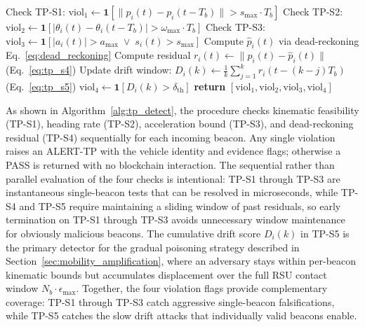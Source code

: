 \documentclass[12pt, a4paper]{report}
\begin{document}
\begin{algorithm}[H]
\caption{Trajectory Poisoning Detection (\texttt{TP-DETECT})}
\begin{algorithmic}[1]
  \small
  \State Check TP-S1: $\mathrm{viol}_1 \gets
    \mathbf{1}\!\left[\|p_i(t)-p_i(t{-}T_b)\| > s_{\max}\cdot T_b\right]$
  \State Check TP-S2: $\mathrm{viol}_2 \gets
    \mathbf{1}\!\left[|\theta_i(t)-\theta_i(t{-}T_b)| > \omega_{\max}\cdot T_b\right]$
  \State Check TP-S3: $\mathrm{viol}_3 \gets
    \mathbf{1}\!\left[|a_i(t)| > a_{\max}
    \;\lor\; s_i(t) > s_{\max}\right]$
  \State Compute $\hat{p}_i(t)$ via dead-reckoning Eq.~\eqref{eq:dead_reckoning}
  \State Compute residual $r_i(t) \gets \|p_i(t) - \hat{p}_i(t)\|$
         \quad (Eq.~\eqref{eq:tp_s4})
  \State Update drift window: $D_i(k) \gets \frac{1}{k}\sum_{j=1}^{k} r_i(t{-}(k{-}j)T_b)$
         \quad (Eq.~\eqref{eq:tp_s5})
  \State $\mathrm{viol}_4 \gets \mathbf{1}\!\left[D_i(k) > \delta_{\mathrm{th}}\right]$
 \State \textbf{return}
    $[\mathrm{viol}_1,\mathrm{viol}_2,\mathrm{viol}_3,\mathrm{viol}_4]$
  \EndProcedure
\end{algorithmic}
\label{alg:tp_detect}
\end{algorithm}

As shown in Algorithm~\ref{alg:tp_detect}, the procedure checks
kinematic feasibility (TP-S1), heading rate (TP-S2), acceleration
bound (TP-S3), and dead-reckoning residual (TP-S4) sequentially for
each incoming beacon. Any single violation raises an ALERT-TP with
the vehicle identity and evidence flags; otherwise a PASS is returned
with no blockchain interaction. The sequential rather than parallel
evaluation of the four checks is intentional: TP-S1 through TP-S3
are instantaneous single-beacon tests that can be resolved in
microseconds, while TP-S4 and TP-S5 require maintaining a sliding
window of past residuals, so early termination on TP-S1 through TP-S3
avoids unnecessary window maintenance for obviously malicious beacons.
The cumulative drift score $D_i(k)$ in TP-S5 is the primary detector
for the gradual poisoning strategy described in
Section~\ref{sec:mobility_amplification}, where an adversary stays
within per-beacon kinematic bounds but accumulates displacement over
the full RSU contact window $N_b \cdot \epsilon_{\max}$. Together,
the four violation flags provide complementary coverage: TP-S1 through
TP-S3 catch aggressive single-beacon falsifications, while TP-S5
catches the slow drift attacks that individually valid beacons enable.
\end{document}
